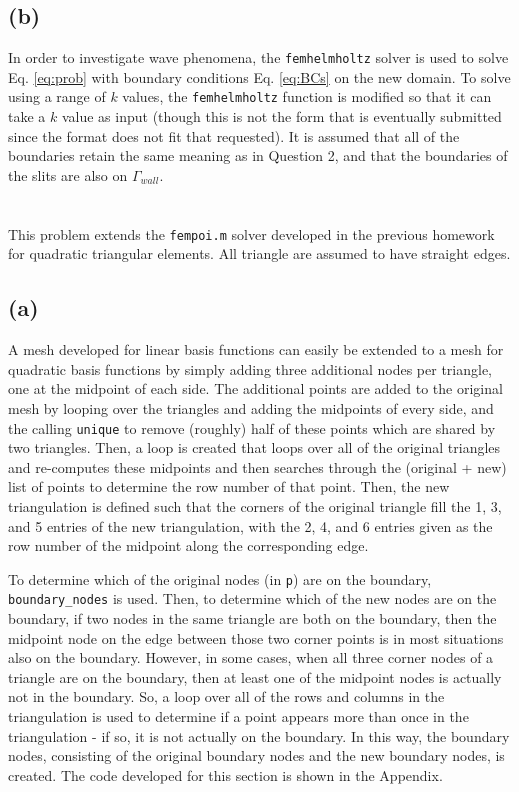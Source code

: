 \documentclass[10pt]{article}
\begin{document}
\subsection{(b)}
In order to investigate wave phenomena, the {\tt femhelmholtz} solver is used to solve Eq. \eqref{eq:prob} with boundary conditions Eq. \eqref{eq:BCs} on the new domain. To solve using a range of \(k\) values, the {\tt femhelmholtz} function is modified so that it can take a \(k\) value as input (though this is not the form that is eventually submitted since the format does not fit that requested). It is assumed that all of the boundaries retain the same meaning as in Question 2, and that the boundaries of the slits are also on \(\Gamma_{wall}\). 




\section{}

This problem extends the {\tt fempoi.m} solver developed in the previous homework for quadratic triangular elements. All triangle are assumed to have straight edges. 

\subsection{(a)}

A mesh developed for linear basis functions can easily be extended to a mesh for quadratic basis functions by simply adding three additional nodes per triangle, one at the midpoint of each side. The additional points are added to the original mesh by looping over the triangles and adding the midpoints of every side, and the calling {\tt unique} to remove (roughly) half of these points which are shared by two triangles. Then, a loop is created that loops over all of the original triangles and re-computes these midpoints and then searches through the (original + new) list of points to determine the row number of that point. Then, the new triangulation is defined such that the corners of the original triangle fill the 1, 3, and 5 entries of the new triangulation, with the 2, 4, and 6 entries given as the row number of the midpoint along the corresponding edge.

To determine which of the original nodes (in {\tt p}) are on the boundary, {\tt boundary\_nodes} is used. Then, to determine which of the new nodes are on the boundary, if two nodes in the same triangle are both on the boundary, then the midpoint node on the edge between those two corner points is in most situations also on the boundary. However, in some cases, when all three corner nodes of a triangle are on the boundary, then at least one of the midpoint nodes is actually not in the boundary. So, a loop over all of the rows and columns in the triangulation is used to determine if a point appears more than once in the triangulation - if so, it is not actually on the boundary. In this way, the boundary nodes, consisting of the original boundary nodes and the new boundary nodes, is created. The code developed for this section is shown in the Appendix.
\end{document}
